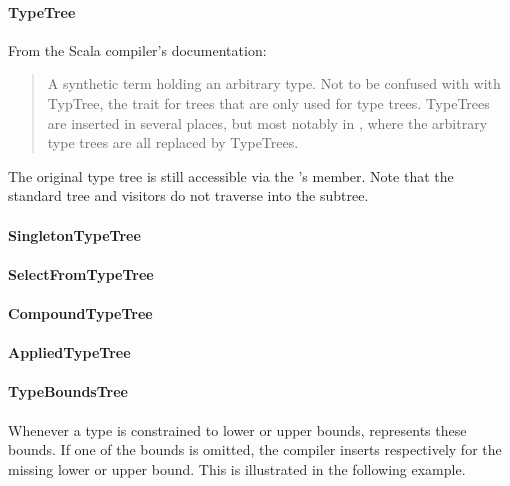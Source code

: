 \paragraph{TypeTree} 

\noindent From the Scala compiler's documentation: 

\begin{quote}
A synthetic term holding an arbitrary type. Not to be confused with with TypTree, the trait for trees that are only used for type trees. TypeTrees are inserted in several places, but most notably in , where the arbitrary type trees are all replaced by TypeTrees.\end{quote}

The original type tree is still accessible via the 's  member. Note that the standard tree  and  visitors do not traverse into the  subtree.

\paragraph{SingletonTypeTree} 

\paragraph{SelectFromTypeTree} 

\paragraph{CompoundTypeTree} 

\paragraph{AppliedTypeTree} 

\paragraph{TypeBoundsTree} 

\noindent Whenever a type is constrained to lower or upper bounds,  represents these bounds. If one of the bounds is omitted, the compiler inserts  respectively  for the missing lower or upper bound. This is illustrated in the following example.

